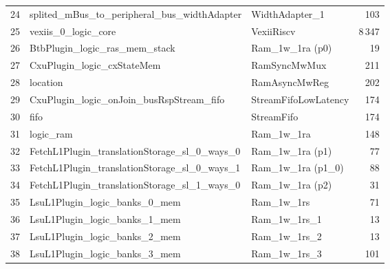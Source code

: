 \begin{table}[!htbp]
\begin{tabular}{rllr}
24 & \quad\quad splited\_mBus\_to\_peripheral\_bus\_widthAdapter         & WidthAdapter\_1                                  &    103 \\
25 & \quad\quad vexiis\_0\_logic\_core                                   & VexiiRiscv                                       &  8\,347 \\
26 & \quad\quad\quad BtbPlugin\_logic\_ras\_mem\_stack                   & Ram\_1w\_1ra (p0)                                &     19 \\
27 & \quad\quad\quad CxuPlugin\_logic\_cxStateMem                        & RamSyncMwMux                                     &    211 \\
28 & \quad\quad\quad\quad location                                       & RamAsyncMwReg                                    &    202 \\
29 & \quad\quad\quad CxuPlugin\_logic\_onJoin\_busRspStream\_fifo        & StreamFifoLowLatency                             &    174 \\
30 & \quad\quad\quad\quad fifo                                           & StreamFifo                                       &    174 \\
31 & \quad\quad\quad\quad\quad logic\_ram                                & Ram\_1w\_1ra                                     &    148 \\
32 & \quad\quad\quad FetchL1Plugin\_translationStorage\_sl\_0\_ways\_0   & Ram\_1w\_1ra (p1)                                &     77 \\
33 & \quad\quad\quad FetchL1Plugin\_translationStorage\_sl\_0\_ways\_1   & Ram\_1w\_1ra (p1\_0)                             &     88 \\
34 & \quad\quad\quad FetchL1Plugin\_translationStorage\_sl\_1\_ways\_0   & Ram\_1w\_1ra (p2)                                &     31 \\
35 & \quad\quad\quad LsuL1Plugin\_logic\_banks\_0\_mem                   & Ram\_1w\_1rs                                     &     71 \\
36 & \quad\quad\quad LsuL1Plugin\_logic\_banks\_1\_mem                   & Ram\_1w\_1rs\_1                                  &     13 \\
37 & \quad\quad\quad LsuL1Plugin\_logic\_banks\_2\_mem                   & Ram\_1w\_1rs\_2                                  &     13 \\
38 & \quad\quad\quad LsuL1Plugin\_logic\_banks\_3\_mem                   & Ram\_1w\_1rs\_3                                  &    101 \\

\end{tabular}
\end{table}
